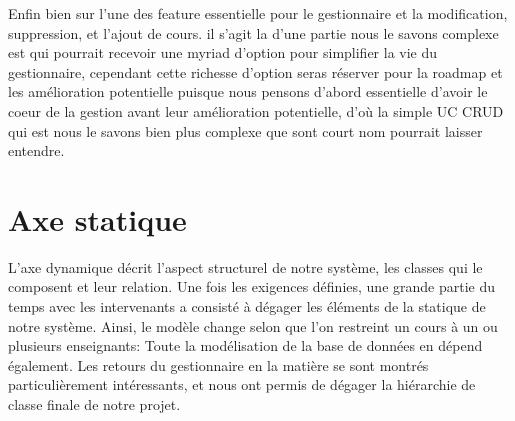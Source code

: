 \documentclass[a4paper,french,final]{memoir}
\begin{document}
Enfin bien sur l'une des feature essentielle pour le gestionnaire et la modification, suppression, et l'ajout de cours. il s'agit la d'une partie nous le savons
complexe est qui pourrait recevoir une myriad d'option pour simplifier la vie du gestionnaire, cependant cette richesse d'option seras réserver pour la roadmap et
les amélioration potentielle puisque nous pensons d'abord essentielle d'avoir le coeur de la gestion avant leur amélioration potentielle, d'où la simple
UC CRUD qui est nous le savons bien plus complexe que sont court nom pourrait laisser entendre.


\chapter{Axe statique}\label{chap:statique}

L'axe dynamique décrit l'aspect structurel de notre système, les classes qui le composent et leur relation.
Une fois les exigences définies, une grande partie du temps avec les intervenants a consisté à dégager les éléments de la statique de notre système. 
Ainsi, le modèle change selon que l'on restreint un cours à un ou plusieurs enseignants: Toute la modélisation de la base de données en dépend également. Les retours du gestionnaire en la matière se sont montrés 
particulièrement intéressants, et nous ont permis de dégager la hiérarchie de classe finale de notre projet. 
\end{document}
